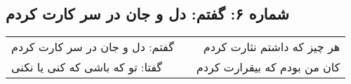 \begin{center}
\section*{شماره ۶: گفتم: دل و جان در سر کارت کردم}
\label{sec:006}
\begin{longtable}{l p{0.5cm} r}
گفتم: دل و جان در سر کارت کردم
&&
هر چیز که داشتم نثارت کردم
\\
گفتا: تو که باشی که کنی یا نکنی
&&
کان من بودم که بیقرارت کردم
\\
\end{longtable}
\end{center}
